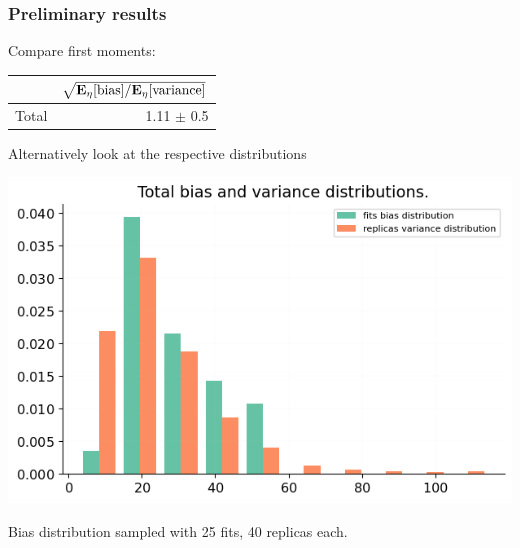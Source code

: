 \begin{frame}\frametitle{Preliminary results}
    \Fontvi
    Compare first moments:

    \begin{center}
    \begin{tabular}{lr}
        \toprule
        {} &  $\sqrt{\mathbf{E}_{\eta}[{\rm bias}] / \mathbf{E}_{\eta}[{\rm variance}]}$\\
        \midrule
        Total      & 1.11 $\pm$ 0.5 \\
        \bottomrule
        \end{tabular}
    \end{center}

    \vspace{8pt}
    Alternatively look at the respective distributions

    \vspace{8pt}
    \begin{center}
        \includegraphics[scale=0.3]{closure_test/plot_bias_variance_distributions_3.png}
    \end{center}

    \vspace{8pt}
    Bias distribution sampled with 25 fits, 40 replicas each.

\end{frame}